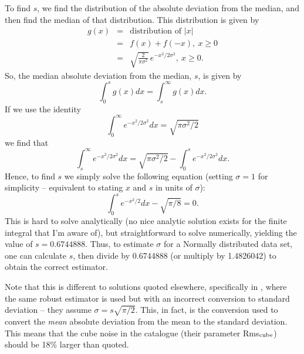 To find $s$, we find the distribution of the absolute deviation from
the median, and then find the median of that distribution. This
distribution is given by
\begin{eqnarray*}
g(x) &= &{\text{distribution of }} |x|\\
     &= &f(x) + f(-x),\ x\ge0\\
     &= &\sqrt{\frac{2}{\pi\sigma^2}}\, e^{-x^2/2\sigma^2},\ x\ge0.
\end{eqnarray*}
So, the median absolute deviation from the median, $s$, is given by
\[
\int_{0}^{s} g(x) dx = \int_{s}^{\infty} g(x) dx.
\]
If we use the identity
\[
\int_{0}^{\infty}e^{-x^2/2\sigma^2} dx = \sqrt{\pi\sigma^2/2}
\] 
we find that 
\[
\int_{s}^{\infty} e^{-x^2/2\sigma^2} dx =
\sqrt{\pi\sigma^2/2}-\int_{0}^{s} e^{-x^2/2\sigma^2}dx.
\]
Hence, to find $s$ we simply solve the following equation (setting
$\sigma=1$ for simplicity -- equivalent to stating $x$ and $s$ in
units of $\sigma$):
\[
\int_{0}^{s}e^{-x^2/2} dx - \sqrt{\pi/8} = 0.
\]
This is hard to solve analytically (no nice analytic solution exists
for the finite integral that I'm aware of), but straightforward to
solve numerically, yielding the value of $s=0.6744888$. Thus, to
estimate $\sigma$ for a Normally distributed data set, one can
calculate $s$, then divide by 0.6744888 (or multiply by 1.4826042) to
obtain the correct estimator.

Note that this is different to solutions quoted elsewhere,
specifically in \citet{meyer04-alt}, where the same robust estimator
is used but with an incorrect conversion to standard deviation -- they
assume $\sigma = s\sqrt{\pi/2}$. This, in fact, is the conversion used
to convert the \emph{mean} absolute deviation from the mean to the
standard deviation. This means that the cube noise in the \hipass
catalogue (their parameter Rms$_{\rm cube}$) should be 18\% larger
than quoted.

